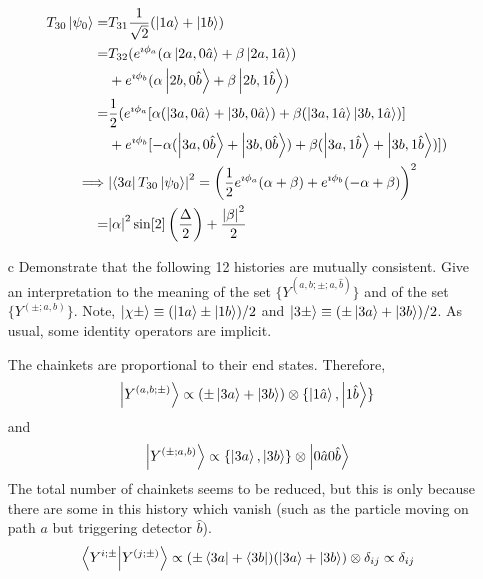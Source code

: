 \documentclass[a4paper,twoside]{article}
\begin{document}
\begin{itemize}
\begin{tcolorbox}[breakable]
\begin{align}
                T_{30} \ket{\psi_0} =& T_{31} \frac{1}{\sqrt{2}} (\ket{1a} + \ket{1b})\\
                =& T_{32} ( e^{\imath \phi_a} (\alpha \ket{2a,0 \hat{a}} + \beta \ket{2a,1 \hat{a}}) \\&+ e^{\imath\phi_b} (\alpha \ket{2b,0 \hat{b}} + \beta \ket{2b,1 \hat{b}}) \\
                =& \frac{1}{2}(e^{\imath\phi_a} [\alpha (\ket{3a,0 \hat{a}} + \ket{3b,0 \hat{a}} ) + \beta (\ket{3a,1 \hat{a}} \ket{3b,1 \hat{a}})]\\
                &+ e^{\imath\phi_b} [-\alpha(\ket{3a,0 \hat{b}} + \ket{3b,0 \hat{b}})+ \beta (\ket{3a,1 \hat{b}} + \ket{3b,1 \hat{b}})])\\
                \implies & \abs{\bra{3a} T_{30} \ket{\psi_0}}^2 =\left( \frac{1}{2} e^{\imath\phi_a} (\alpha + \beta)+ e^{\imath\phi_b} (- \alpha + \beta ) \right)^2\\
                =& \abs{\alpha}^2 \sin[2]\left( \frac{\Delta}{2} \right) + \frac{\abs{\beta}^2}{2}
            \end{align}
        \end{tcolorbox}
    \item[c] Demonstrate that the following 12 histories are mutually consistent. Give an interpretation to the meaning of the set $\{Y^{(a,b;\pm;\hat{a},\hat{b})}\} $ and of the set $\{Y^{(\pm;a,b)}\}$. Note, $ \ket{\chi\pm} \equiv (\ket{1a} \pm \ket{1b}) / 2 $ and $ \ket{3\pm} \equiv (\pm \ket{3a} + \ket{3b})/2 $. As usual, some identity operators are implicit.
        \begin{tcolorbox}[breakable]
            The chainkets are proportional to their end states. Therefore,
            \begin{equation}
                \ket{Y^{(a,b;\pm)}} \propto (\pm \ket{3a} + \ket{3b}) \otimes \{\ket{1 \hat{a}}, \ket{1 \hat{b}}\}
            \end{equation}
            and
            \begin{equation}
                \ket{Y^{(\pm;a,b)}} \propto \{\ket{3a}, \ket{3b}\} \otimes \ket{0 \hat{a} 0 \hat{b}}
            \end{equation}
            The total number of chainkets seems to be reduced, but this is only because there are some in this history which vanish (such as the particle moving on path $ a $ but triggering detector $ \hat{b} $).
            \begin{equation}
                \bra{Y^{i;\pm}} \ket{Y^{(j;\pm)}} \propto (\pm \bra{3a} + \bra{3b})(\ket{3a} + \ket{3b}) \otimes \delta_{ij} \propto \delta_{ij}

\end{equation}
\end{tcolorbox}
\end{itemize}
\end{document}
